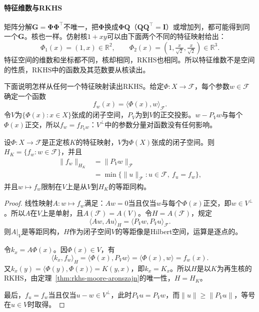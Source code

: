 \paragraph{特征维数与RKHS}

矩阵分解$\bm G=\bm\Phi\bm\Phi^{\top}$不唯一，把$\bm\Phi$换成$\bm\Phi\bm Q$（$\bm Q\bm Q^{\top}=\bm I$）或增加列，都可能得到同一个$\bm G$。核也一样。仿射核$1+xy$可以由下面两个不同的特征映射给出：
\[
\Phi_1(x)=(1,x)\in\mathbb R^2,\qquad
\Phi_2(x)=(1,\tfrac{x}{\sqrt2},\tfrac{x}{\sqrt2})\in\mathbb R^3 .
\]
特征空间的维数和坐标都不同，核却相同，RKHS也相同。所以特征维数不是空间的性质，RKHS中的函数及其范数要从核读出。

下面说明怎样从任何一个特征映射读出RKHS。给定$\Phi:X\to\mathcal F$，每个参数$w\in\mathcal F$确定一个函数
\[
f_w(x)=\langle\Phi(x),w\rangle_{\mathcal F}.
\]
令$V$为$\{\Phi(x):x\in X\}$张成的闭子空间，$P_V$为到$V$的正交投影。$w-P_Vw$与每个$\Phi(x)$正交，所以$f_w=f_{P_Vw}$：$V^\perp$中的参数分量对函数没有任何影响。

\begin{theorem}[特征映射给出的RKHS]
\label{thm:rkhs-feature-space}
设$\Phi:X\to\mathcal F$是正定核$K$的特征映射，$V$为$\Phi(X)$张成的闭子空间。则$H_K=\{f_w:w\in\mathcal F\}$，并且
\begin{equation}
\begin{aligned}
\lVert f_w\rVert_{H_K}&=\lVert P_Vw\rVert_{\mathcal F}\\
&=\min\{\lVert u\rVert_{\mathcal F}:u\in\mathcal F,\ f_u=f_w\} ,
\end{aligned}
\label{eq:rkhs-feature-norm}
\end{equation}
并且$w\mapsto f_w$限制在$V$上是从$V$到$H_K$的等距同构。
\end{theorem}

\begin{proof}
线性映射$A:w\mapsto f_w$满足：$Aw=0$当且仅当$w$与每个$\Phi(x)$正交，即$w\in V^\perp$。所以$A$在$V$上是单射，且$A(\mathcal F)=A(V)$。令$H=A(\mathcal F)$，规定
\[
\langle Aw,Au\rangle_H=\langle P_Vw,P_Vu\rangle_{\mathcal F}.
\]
则$A|_V$是等距同构，$H$作为闭子空间$V$的等距像是Hilbert空间，运算是逐点的。

令$k_x=A\Phi(x)$。因$\Phi(x)\in V$，有
\[
\langle k_x,f_w\rangle_H=\langle\Phi(x),P_Vw\rangle=\langle\Phi(x),w\rangle=f_w(x).
\]
又$k_x(y)=\langle\Phi(y),\Phi(x)\rangle=K(y,x)$，即$k_x=K_x$。所以$H$是以$K$为再生核的RKHS，由定理~\ref{thm:rkhs-moore-aronszajn}的唯一性，$H=H_K$。

最后，$f_u=f_w$当且仅当$u-w\in V^\perp$，此时$P_Vu=P_Vw$，而$\lVert u\rVert\geq\lVert P_Vu\rVert$，等号在$u\in V$时取得。
\end{proof}

